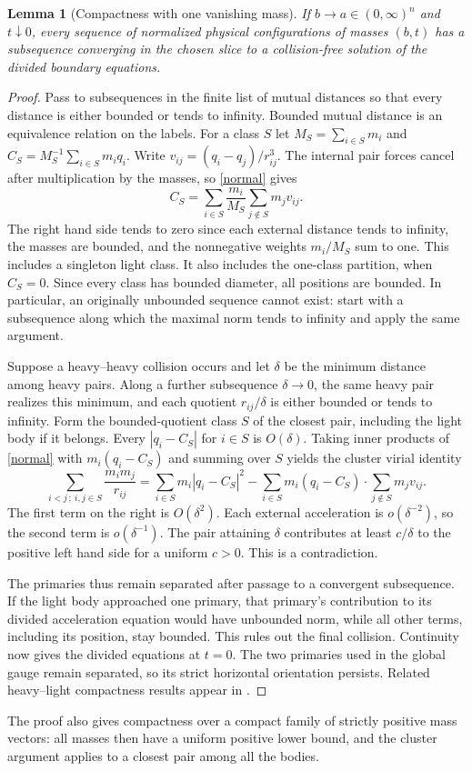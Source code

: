 \documentclass[11pt]{article}
\newtheorem{lemma}[theorem]{Lemma}
\begin{document}
\begin{lemma}[Compactness with one vanishing mass]\label{compactone}
If $b\to a\in(0,\infty)^n$ and $t\downarrow0$, every sequence of normalized physical configurations of masses $(b,t)$ has a subsequence converging in the chosen slice to a collision-free solution of the divided boundary equations.
\end{lemma}
\begin{proof}
Pass to subsequences in the finite list of mutual distances so that every distance is either bounded or tends to infinity. Bounded mutual distance is an equivalence relation on the labels. For a class $S$ let $M_S=\sum_{i\in S}m_i$ and $C_S=M_S^{-1}\sum_{i\in S}m_iq_i$. Write $v_{ij}=(q_i-q_j)/r_{ij}^3$. The internal pair forces cancel after multiplication by the masses, so \eqref{normal} gives
\[
 C_S=\sum_{i\in S}\frac{m_i}{M_S}\sum_{j\notin S}m_jv_{ij}.
\]
The right hand side tends to zero since each external distance tends to infinity, the masses are bounded, and the nonnegative weights $m_i/M_S$ sum to one. This includes a singleton light class. It also includes the one-class partition, when $C_S=0$. Since every class has bounded diameter, all positions are bounded. In particular, an originally unbounded sequence cannot exist: start with a subsequence along which the maximal norm tends to infinity and apply the same argument.

Suppose a heavy--heavy collision occurs and let $\delta$ be the minimum distance among heavy pairs. Along a further subsequence $\delta\to0$, the same heavy pair realizes this minimum, and each quotient $r_{ij}/\delta$ is either bounded or tends to infinity. Form the bounded-quotient class $S$ of the closest pair, including the light body if it belongs. Every $|q_i-C_S|$ for $i\in S$ is $O(\delta)$. Taking inner products of \eqref{normal} with $m_i(q_i-C_S)$ and summing over $S$ yields the cluster virial identity
\[
 \sum_{i<j\,;\ i,j\in S}\frac{m_im_j}{r_{ij}}
 =\sum_{i\in S}m_i|q_i-C_S|^2
 -\sum_{i\in S}m_i(q_i-C_S)\cdot\sum_{j\notin S}m_jv_{ij}.
\]
The first term on the right is $O(\delta^2)$. Each external acceleration is $o(\delta^{-2})$, so the second term is $o(\delta^{-1})$. The pair attaining $\delta$ contributes at least $c/\delta$ to the positive left hand side for a uniform $c>0$. This is a contradiction.

The primaries thus remain separated after passage to a convergent subsequence. If the light body approached one primary, that primary's contribution to its divided acceleration equation would have unbounded norm, while all other terms, including its position, stay bounded. This rules out the final collision. Continuity now gives the divided equations at $t=0$. The two primaries used in the global gauge remain separated, so its strict horizontal orientation persists. Related heavy--light compactness results appear in \cite[Theorems 6 and 8, Lemmas 9--10]{light}.
\end{proof}
The proof also gives compactness over a compact family of strictly positive mass vectors: all masses then have a uniform positive lower bound, and the cluster argument applies to a closest pair among all the bodies.
\end{document}
